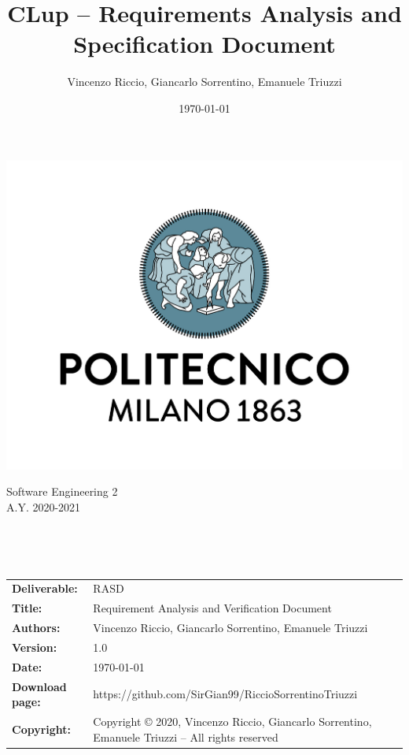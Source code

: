 \documentclass[a4paper,oneside,11pt]{book}   %
\title{\LARGE{CLup -- Requirements Analysis and \newline Specification Document}}
\author{Vincenzo Riccio, Giancarlo Sorrentino, Emanuele Triuzzi}
\date{\today}
\begin{document}
\begin{titlingpage} 
    \begin{center}
        \includegraphics[height=0.52\linewidth]{pictures/polimi}\\ %
        \begin{large}
            Software Engineering 2 \\
            A.Y. 2020-2021\\
        \end{large}
        \vspace{4cm} %
        \begin{large} 
            \textbf{\thetitle} \\
        \end{large}
        \vspace{0.7cm}
        \theauthor\\
        \vspace{7.3cm} %
        \thedate
    \end{center}
\end{titlingpage}

\newpage
\begin{table}[H]
    \begin{tabu} to \textwidth { X[0.3,r,p] X[0.7,l,p] }
        \hline
        \textbf{Deliverable:}   & RASD\\
        \textbf{Title:}         & Requirement Analysis and Verification Document \\
        \textbf{Authors:}       & Vincenzo Riccio, Giancarlo Sorrentino, \newline Emanuele Triuzzi \\
        \textbf{Version:}       & 1.0 \\ 
        \textbf{Date:}          & \today \\
        \textbf{Download page:} & https://github.com/SirGian99/RiccioSorrentinoTriuzzi \\
        \textbf{Copyright:}     & Copyright © 2020, Vincenzo Riccio, Giancarlo Sorrentino, Emanuele Triuzzi -- All rights reserved \\
        \hline
    \end{tabu}
\end{table}
\end{document}
